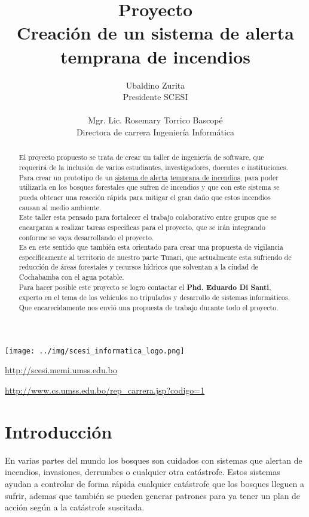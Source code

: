\documentclass[letter,12pt]{article}
\title{Proyecto\\ Creación de un sistema de alerta temprana de incendios}
\author{Ubaldino Zurita\\{\normalsize Presidente SCESI}\\\\Mgr. Lic. Rosemary Torrico Bascopé\\{\normalsize Directora de carrera Ingeniería Informática}}
\begin{document}
\maketitle
\begin{center}
    \texttt{[image: ../img/scesi\_informatica\_logo.png]} 
\end{center}
\begin{center}
    \url {http://scesi.memi.umss.edu.bo}\\
\end{center}
\begin{center}
    \url{http://www.cs.umss.edu.bo/rep_carrera.jsp?codigo=1}
\end{center}
\pagebreak
\tableofcontents
\pagebreak
\begin{abstract}
El proyecto propuesto se trata de crear un taller de ingeniería de software, que requerirá de la inclusión de varios estudiantes, investigadores, docentes e instituciones. Para crear un prototipo de un \underline{sistema de alerta} \underline{temprana de incendios}, para poder utilizarla en los bosques forestales que sufren de incendios y que con este sistema se pueda obtener una reacción rápida para mitigar el gran daño que estos incendios causan al medio ambiente.\\

Este taller esta pensado para fortalecer el trabajo colaborativo entre grupos que se encargaran a realizar tareas especificas para el proyecto, que se irán integrando conforme se vaya desarrollando el proyecto.\\

Es en este sentido que también esta orientado para crear una propuesta de vigilancia específicamente al territorio de nuestro parte Tunari, que actualmente esta sufriendo de reducción de áreas forestales y recursos hídricos que solventan a la ciudad de Cochabamba con el agua potable.\\

Para hacer posible este proyecto se logro contactar el {\bf Phd. Eduardo Di Santi}, experto en el tema de los vehículos no tripulados y desarrollo de sistemas informáticos. Que encarecidamente nos envió una propuesta de trabajo durante todo el proyecto.\\

\end{abstract}
\pagebreak

\section{Introducci\'on}
En varias partes del mundo los bosques son cuidados con sistemas que alertan de incendios, invasiones, derrumbes o cualquier otra catástrofe. Estos sistemas ayudan a controlar de forma rápida cualquier catástrofe que los bosques lleguen a sufrir, ademas que también se pueden generar patrones para ya tener un plan de acción según a la catástrofe suscitada.\\
\end{document}
